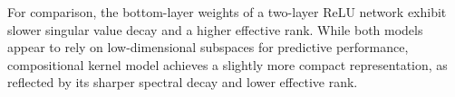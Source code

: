 \documentclass[sn-mathphys-num]{sn-jnl}%
\numberwithin{equation}{section}
\theoremstyle{thmstyleone}%
\theoremstyle{thmstyletwo}%
\theoremstyle{thmstylethree}%
\begin{document}
For comparison, the bottom-layer weights of a two-layer ReLU network exhibit slower singular value decay and a higher effective rank. While both models appear to rely on low-dimensional subspaces for predictive performance, compositional kernel model achieves a slightly more compact representation, as reflected by its sharper spectral decay and lower effective rank.



%
\end{document}
